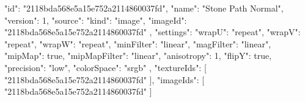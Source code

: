 {
  "id": "2118bda568e5a15e752a2114860037fd",
  "name": "Stone Path Normal",
  "version": 1,
  "source": {
    "kind": "image",
    "imageId": "2118bda568e5a15e752a2114860037fd"
  },
  "settings": {
    "wrapU": "repeat",
    "wrapV": "repeat",
    "wrapW": "repeat",
    "minFilter": "linear",
    "magFilter": "linear",
    "mipMap": true,
    "mipMapFilter": "linear",
    "anisotropy": 1,
    "flipY": true,
    "precision": "low",
    "colorSpace": "srgb"
  },
  "textureIds": [
    "2118bda568e5a15e752a2114860037fd"
  ],
  "imageIds": [
    "2118bda568e5a15e752a2114860037fd"
  ]
}
